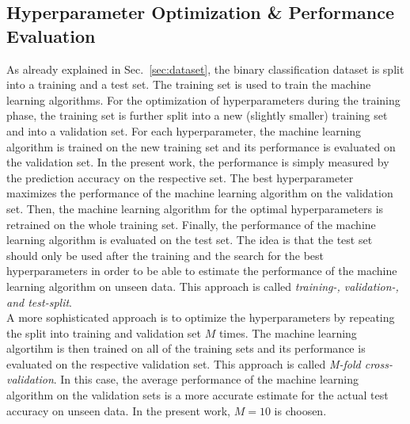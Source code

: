 \subsection{Hyperparameter Optimization \& Performance Evaluation}
As already explained in Sec.~\ref{sec:dataset}, the binary classification dataset is split into a training and a test set. The training set is used to train the machine learning algorithms. For the optimization of hyperparameters during the training phase, the training set is further split into a new (slightly smaller) training set and into a validation set. For each hyperparameter, the machine learning algorithm is trained on the new training set and its performance is evaluated on the validation set. In the present work, the performance is simply measured by the prediction accuracy on the respective set. The best hyperparameter maximizes the performance of the machine learning algorithm on the validation set. Then, the machine learning algorithm for the optimal hyperparameters is retrained on the whole training set. Finally, the performance of the machine learning algorithm is evaluated on the test set. The idea is that the test set should only be used after the training and the search for the best hyperparameters in order to be able to estimate the performance of the machine learning algorithm on unseen data. This approach is called \textit{training-, validation-, and test-split}.\\

A more sophisticated approach is to optimize the hyperparameters by repeating the split into training and validation set $M$ times. The machine learning algortihm is then trained on all of the training sets and its performance is evaluated on the respective validation set. This approach is called \textit{M-fold cross-validation}. In this case, the average performance of the machine learning algorithm on the validation sets is a more accurate estimate for the actual test accuracy on unseen data. In the present work, $M=10$ is choosen.